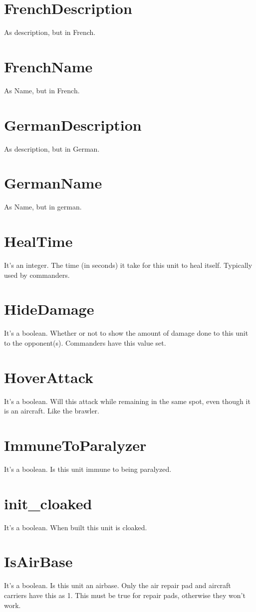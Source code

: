 \documentclass[a4paper,10pt]{article}
\begin{document}
\section{FrenchDescription}
As description, but in French.

\section{FrenchName}
As Name, but in French.

\section{GermanDescription}
As description, but in German.

\section{GermanName}
As Name, but in german.

\section{HealTime}
It's an integer. The time (in seconds) it take for this unit to heal itself. Typically used by commanders.

\section{HideDamage}
It's a boolean. Whether or not to show the amount of damage done to this unit to the opponent(s). Commanders have this value set.

\section{HoverAttack}
It's a boolean. Will this attack while remaining in the same spot, even though it is an aircraft. Like the brawler.

\section{ImmuneToParalyzer}
It's a boolean. Is this unit immune to being paralyzed.

\section{init\_cloaked}
It's a boolean. When built this unit is cloaked.

\section{IsAirBase}
It's a boolean. Is this unit an airbase. Only the air repair pad and aircraft carriers have this as 1. This must be true for repair pads, otherwise they won't work.
\end{document}
